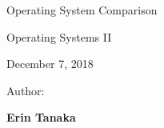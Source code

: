 \begin{titlepage}
\label{titlepage}
    \begin{singlespace}
		\hfill  
        \par\vspace{.2in}
        \centering
        \scshape{
            \vspace{.3in}
            \Huge{Operating System Comparison}\par  %
            \vspace{.3in}
            \large Operating Systems II\par
            \vspace{.1in}
            \large December 7, 2018\par
            \vspace{.5in}
            \Large Author:\par\vspace{.1in} 
            \textbf{\LARGE Erin Tanaka}\par\vspace{.07in} 
            \vspace{1.4in}
            \par
        }
    \end{singlespace}
            

\end{titlepage}
